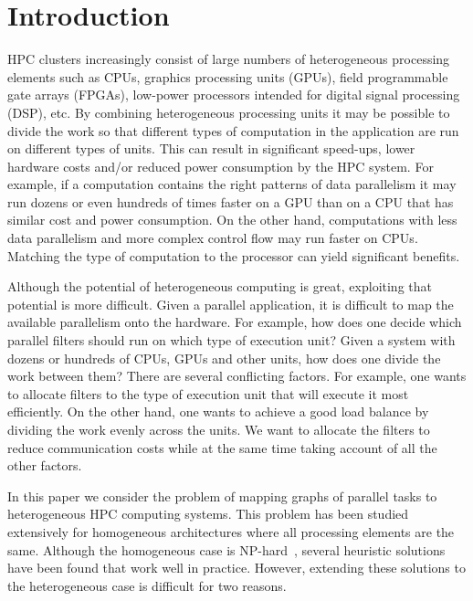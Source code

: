 \section{Introduction}
\label{sec:introduction}

HPC clusters increasingly consist of large numbers of heterogeneous
processing elements such as CPUs, graphics processing units (GPUs),
field programmable gate arrays (FPGAs), low-power processors intended
for digital signal processing (DSP), etc. By combining heterogeneous
processing units it may be possible to divide the work so that different
types of computation in the application are run on different types of
units. This can result in significant speed-ups, lower hardware costs
and/or reduced power consumption by the HPC system.  For example, if a
computation contains the right patterns of data parallelism it may run
dozens or even hundreds of times faster on a GPU than on a CPU that has
similar cost and power consumption. On the other hand, computations with
less data parallelism and more complex control flow may run faster on
CPUs. Matching the type of computation to the processor can yield
significant benefits.

Although the potential of heterogeneous computing is great, exploiting
that potential is more difficult. Given a parallel application, it is
difficult to map the available parallelism onto the hardware. For
example, how does one decide which parallel filters should run on which
type of execution unit? Given a system with dozens or hundreds of CPUs,
GPUs and other units, how does one divide the work between them?  There
are several conflicting factors. For example, one wants to allocate
filters to the type of execution unit that will execute it most
efficiently. On the other hand, one wants to achieve a good load balance
by dividing the work evenly across the units. %
We want to allocate the filters to reduce communication costs while at the
same time taking account of all the other factors.

In this paper we consider the problem of mapping graphs of parallel
tasks to heterogeneous HPC computing systems. This problem has been
studied extensively for homogeneous architectures where all processing
elements are the same. Although the homogeneous case is
NP-hard~\cite{vsar89}, several heuristic solutions have been found that
work well in practice. However, extending these solutions to the
heterogeneous case is difficult for two reasons.

